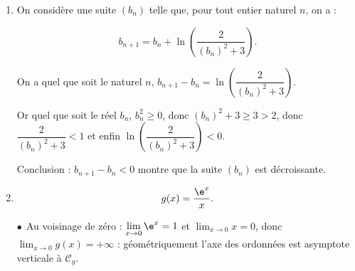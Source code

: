 \begin{enumerate}[resume]
On sait qu'alors que, quel que soit le naturel $n$, \: $b_n = b_0 \times \left(\dfrac{1}{3}\right)^n = - 2 \times \left(\dfrac{1}{3}\right)^n$.

Finalement $b_n = a_n - 4 \iff a_n = 4 + b_n = 4 - 2\times \left(\dfrac{1}{3}\right)^n$.
\item On considère une suite $\left(b_n\right)$ telle que, pour tout entier naturel $n$, on a :

\[b_{n+1} = b_n + \ln \left(\dfrac{2}{\left(b_n \right)^2 + 3}\right).\]

%
On a quel que soit le naturel $n$, \: $b_{n+1} - b_n = \ln \left(\dfrac{2}{\left(b_n \right)^2 + 3}\right)$.

Or quel que soit le réel $b_n$, \: $b_n^2 \geqslant 0$, donc $\left(b_n\right)^2 + 3 \geqslant 3 > 2$, donc $\dfrac{2}{\left(b_n \right)^2 + 3} < 1$ et enfin $\ln \left(\dfrac{2}{\left(b_n \right)^2 + 3}\right) < 0$.

Conclusion : $b_{n+1} - b_n < 0$ montre que la suite $\left(b_n\right)$ est décroissante.

\item %

\[g(x) = \dfrac{\e^x}{x}.\]

%
%
$\bullet~~$Au voisinage de zéro : $\displaystyle\lim_{x \to 0} \e^x = 1$ et $\displaystyle\lim_{x \to 0}x  = 0$, donc $\displaystyle\lim_{x \to 0} g(x) = +\infty$ : géométriquement l'axe des ordonnées est asymptote verticale à $\mathcal{C}_g$.


\end{enumerate}
